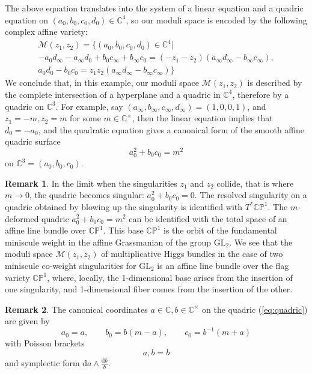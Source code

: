 \documentclass[11pt, oneside, reqno]{amsart}
\theoremstyle{definition} \newtheorem{definition}{Definition}[section]
\theoremstyle{definition} \newtheorem{remark}[definition]{Remark}
\theoremstyle{definition} \newtheorem{remarks}[definition]{Remarks}
\theoremstyle{definition} \newtheorem{question}[definition]{Question}
\theoremstyle{definition} \newtheorem*{note}{Note}
\theoremstyle{definition} \newtheorem{example}[definition]{Example}
\theoremstyle{definition} \newtheorem{examples}[definition]{Examples}
\newcommand{\bb}[1]{\mathbb{#1}}
\newcommand{\mc}[1]{\mathcal{#1}}
\newcommand{\CC}{\mathbb{C}}
\newcommand{\GL}{\mathrm{GL}}
\renewcommand{\d}{\mathrm{d}}
\begin{document}
   The above equation translates into the system of a linear
   equation and a quadric equation on $(a_0, b_0, c_0, d_0) \in \CC^4$, so our moduli space is encoded by the following complex affine variety:
   \begin{multline*}
\mc M(z_1,z_2)=
\big \{  (a_0, b_0, c_0, d_0) \in \CC^4 | \\
       -a_0 d_\infty - a_\infty d_0 + b_0 c_\infty + b_\infty c_0 
       = ( - z_1 - z_2) (a_\infty d_\infty - b_\infty c_\infty), \\
      a_0 d_0 - b_0 c_0 = 
       z_1 z_2 (a_\infty d_\infty - b_\infty c_\infty) \big \}
     \end{multline*}
     We conclude that, in this example, our moduli space $\mc M(z_1,z_2)$ is described by the complete intersection of a hyperplane and a  quadric in $\CC^4$, therefore by a quadric on $\CC^3$. For example,
     say $(a_\infty, b_\infty, c_\infty, d_\infty) = (1,0,0,1)$,
     and $z_1 = -m, z_2 = m$ for some $m \in \CC^\times$, then the linear equation implies that $d_0 = -a_0$,
     and the quadratic equation gives a canonical form of the smooth affine quadric
     surface 
     \begin{equation*}
       \label{eq:quadric}
         a_0^2 + b_0 c_0  = m^2 
     \end{equation*}
on  $\CC^3 = (a_0, b_0, c_0)$.

\begin{remark}
  In the limit when the singularities $z_1$ and $z_2$ collide, that is where $m \to 0$,
  the quadric becomes singular: $a_0^2 + b_0 c_0 = 0$. The resolved
  singularity on a quadric obtained by blowing up the singularity is identified with $T^{*} \bb{CP}^1$.
  The $m$-deformed quadric $a_0^2 + b_0 c_0 = m^2$ can be identified
  with the total space of an affine line bundle over $\bb{CP}^1$. This base $\bb{CP}^1$ is the orbit
  of the fundamental miniscule weight in the affine Grassmanian of the group $\GL_2$.
  We see that the moduli space $\mc M(z_1,z_2)$ of multiplicative Higgs bundles in the case of two miniscule co-weight singularities for $\GL_2$ is an affine line bundle over the flag variety $\bb{CP}^1$, 
where, locally, the 1-dimensional base arises 
from the insertion of one singularity,
and 1-dimensional fiber comes from the insertion of the other.
\end{remark}

\begin{remark}
  The canonical coordinates $a \in \CC, b \in \CC^{\times}$ on the quadric (\ref{eq:quadric}) are given by
  \begin{equation*}
    a_0 = a, \qquad b_0 = b(m - a), \qquad c_0 = b^{-1}(m+a)
  \end{equation*}
  with Poisson brackets
  \begin{equation*}
    {a,b} = b
  \end{equation*}
  and symplectic form $\d a \wedge \frac{\d b} b$.  
\end{remark}
\end{document}
